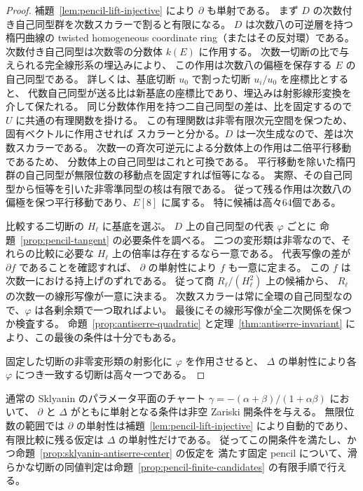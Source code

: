 \begin{proof}
補題~\ref{lem:pencil-lift-injective} により $\partial$ も単射である。
まず $D$ の次数付き自己同型群を次数スカラーで割ると有限になる。
$D$ は次数八の可逆層を持つ楕円曲線の twisted homogeneous
coordinate ring（またはその反対環）である。
次数付き自己同型は次数零の分数体 $k(E)$ に作用する。
次数一切断の比で与えられる完全線形系の埋込みにより、
この作用は次数八の偏極を保存する $E$ の自己同型である。
詳しくは、基底切断 $u_0$ で割った切断 $u_i/u_0$ を座標比とすると、
代数自己同型が送る比は新基底の座標比であり、埋込みは射影線形変換を介して保たれる。
同じ分数体作用を持つ二自己同型の差は、比を固定するので
$U$ に共通の有理関数を掛ける。
この有理関数は非零有限次元空間を保つため、固有ベクトルに作用させれば
スカラーと分かる。$D$ は一次生成なので、差は次数スカラーである。
次数一の斉次可逆元による分数体上の作用は二倍平行移動であるため、
分数体上の自己同型はこれと可換である。
平行移動を除いた楕円群の自己同型が無限位数の移動点を固定すれば恒等になる。
実際、その自己同型から恒等を引いた非零準同型の核は有限である。
従って残る作用は次数八の偏極を保つ平行移動であり、$E[8]$ に属する。
特に候補は高々64個である。

比較する二切断の $H_\ell$ に基底を選ぶ。
$D$ 上の自己同型の代表 $\varphi$ ごとに
命題~\ref{prop:pencil-tangent} の必要条件を調べる。
二つの変形類は非零なので、それらの比較に必要な
$H_\ell$ 上の倍率は存在するなら一意である。
代表写像の差が $\partial f$ であることを確認すれば、
$\partial$ の単射性により $f$ も一意に定まる。
この $f$ は次数一における持上げのずれである。
従って商 $R_\ell/(H_\ell^2)$ 上の候補から、
$R_\ell$ の次数一の線形写像が一意に決まる。
次数スカラーは常に全環の自己同型なので、$\varphi$ は各剰余類で一つ取ればよい。
最後にその線形写像が全二次関係を保つか検査する。
命題~\ref{prop:antiserre-quadratic} と定理~\ref{thm:antiserre-invariant}
により、この最後の条件は十分でもある。

固定した切断の非零変形類の射影化に $\varphi$ を作用させると、
$\Delta$ の単射性により各 $\varphi$ につき一致する切断は高々一つである。
\end{proof}

\begin{proposition}
\label{prop:pencil-tangent-generic}
通常の Sklyanin のパラメータ平面のチャート
$\gamma=-(\alpha+\beta)/(1+\alpha\beta)$ において、
$\partial$ と $\Delta$ がともに単射となる条件は非空 Zariski 開条件を与える。
無限位数の範囲では $\partial$ の単射性は補題~\ref{lem:pencil-lift-injective}
により自動的であり、有限比較に残る仮定は $\Delta$ の単射性だけである。
従ってこの開条件を満たし、かつ命題~\ref{prop:sklyanin-antiserre-center} の仮定を
満たす固定 pencil について、滑らかな切断の同値判定は命題~\ref{prop:pencil-finite-candidates} の有限手順で行える。
\end{proposition}

